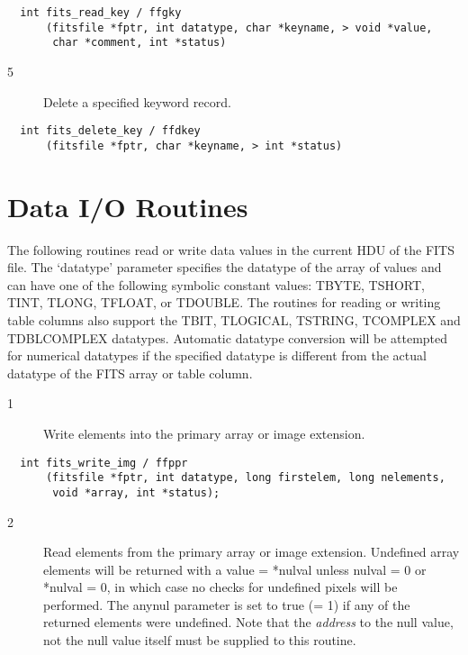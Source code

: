 \begin{verbatim}
  int fits_read_key / ffgky
      (fitsfile *fptr, int datatype, char *keyname, > void *value,
       char *comment, int *status)
\end{verbatim}

\begin{description}
\item[5 ] Delete a specified keyword record.
\end{description}

\begin{verbatim}
  int fits_delete_key / ffdkey
      (fitsfile *fptr, char *keyname, > int *status)
\end{verbatim}


\section{Data I/O Routines}

The following routines read or write data values in the current HDU of
the FITS file. The `datatype' parameter specifies the datatype of the
array of values and can have one of the following symbolic constant
values: TBYTE, TSHORT, TINT, TLONG, TFLOAT, or TDOUBLE.  The routines
for reading or writing table columns also support the TBIT, TLOGICAL,
TSTRING, TCOMPLEX and TDBLCOMPLEX datatypes. Automatic datatype conversion
will be attempted for numerical datatypes if the specified datatype is
different from the actual datatype of the FITS array or table column.


\begin{description}
\item[1 ] Write elements into the primary array or image extension.
\end{description}

\begin{verbatim}
  int fits_write_img / ffppr
      (fitsfile *fptr, int datatype, long firstelem, long nelements,
       void *array, int *status);
\end{verbatim}

\begin{description}
\item[2 ] Read elements from the primary array or image extension.
    Undefined array elements will be returned with a value = *nulval
    unless nulval = 0 or *nulval = 0, in which case no checks
    for undefined pixels will be performed. The anynul parameter is
    set to true (= 1) if any of the returned
    elements were undefined. Note that the {\em address} to the
   null value, not the null value itself must be supplied to this routine.
\end{description}

